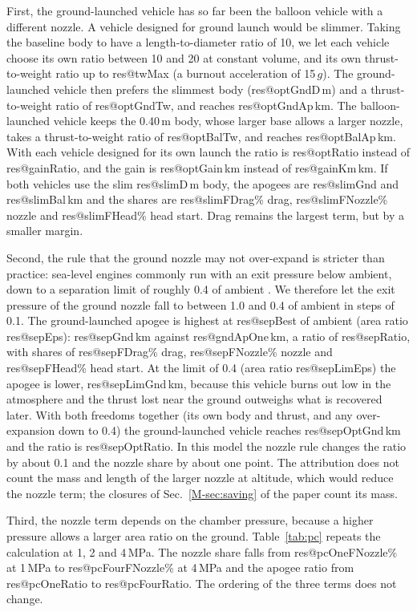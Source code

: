\documentclass[11pt,a4paper]{article}
\makeatletter
\newcommand{\R}[1]{\csname res@#1\endcsname}
\makeatother
\begin{document}
First, the ground-launched vehicle has so far been the balloon vehicle with a different nozzle. A vehicle designed for ground launch would be slimmer. Taking the baseline body to have a length-to-diameter ratio of 10, we let each vehicle choose its own ratio between 10 and 20 at constant volume, and its own thrust-to-weight ratio up to \R{twMax} (a burnout acceleration of 15\,$g$). The ground-launched vehicle then prefers the slimmest body (\R{optGndD}\,m) and a thrust-to-weight ratio of \R{optGndTw}, and reaches \R{optGndAp}\,km. The balloon-launched vehicle keeps the 0.40\,m body, whose larger base allows a larger nozzle, takes a thrust-to-weight ratio of \R{optBalTw}, and reaches \R{optBalAp}\,km. With each vehicle designed for its own launch the ratio is \R{optRatio} instead of \R{gainRatio}, and the gain is \R{optGain}\,km instead of \R{gainKm}\,km. If both vehicles use the slim \R{slimD}\,m body, the apogees are \R{slimGnd} and \R{slimBal}\,km and the shares are \R{slimFDrag}\% drag, \R{slimFNozzle}\% nozzle and \R{slimFHead}\% head start. Drag remains the largest term, but by a smaller margin.

Second, the rule that the ground nozzle may not over-expand is stricter than practice: sea-level engines commonly run with an exit pressure below ambient, down to a separation limit of roughly 0.4 of ambient \cite{sutton2017}. We therefore let the exit pressure of the ground nozzle fall to between 1.0 and 0.4 of ambient in steps of 0.1. The ground-launched apogee is highest at \R{sepBest} of ambient (area ratio \R{sepEps}): \R{sepGnd}\,km against \R{gndApOne}\,km, a ratio of \R{sepRatio}, with shares of \R{sepFDrag}\% drag, \R{sepFNozzle}\% nozzle and \R{sepFHead}\% head start. At the limit of 0.4 (area ratio \R{sepLimEps}) the apogee is lower, \R{sepLimGnd}\,km, because this vehicle burns out low in the atmosphere and the thrust lost near the ground outweighs what is recovered later. With both freedoms together (its own body and thrust, and any over-expansion down to 0.4) the ground-launched vehicle reaches \R{sepOptGnd}\,km and the ratio is \R{sepOptRatio}. In this model the nozzle rule changes the ratio by about 0.1 and the nozzle share by about one point. The attribution does not count the mass and length of the larger nozzle at altitude, which would reduce the nozzle term; the closures of Sec.~\ref{M-sec:saving} of the paper count its mass.

Third, the nozzle term depends on the chamber pressure, because a higher pressure allows a larger area ratio on the ground. Table~\ref{tab:pc} repeats the calculation at 1, 2 and 4\,MPa. The nozzle share falls from \R{pcOneFNozzle}\% at 1\,MPa to \R{pcFourFNozzle}\% at 4\,MPa and the apogee ratio from \R{pcOneRatio} to \R{pcFourRatio}. The ordering of the three terms does not change.
\end{document}
